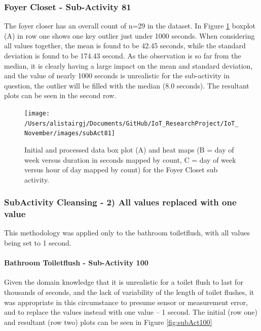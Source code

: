 \documentclass[11pt,]{article}
\let\oldparagraph\paragraph
\renewcommand{\paragraph}[1]{\oldparagraph{#1}\mbox{}}
\begin{document}
\hypertarget{foyer-closet---sub-activity-81}{%
\subsubsection{Foyer Closet - Sub-Activity
81}\label{foyer-closet---sub-activity-81}}

The foyer closer has an overall count of n=29 in the dataset. In Figure
\ref{fig:subAct81} boxplot (A) in row one shows one key outlier just
under 1000 seconds. When considering all values together, the mean is
found to be 42.45 seconds, while the standard deviation is found to be
174.43 second. As the observation is so far from the median, it is
clearly having a large impact on the mean and standard deviation, and
the value of nearly 1000 seconds is unrealistic for the sub-activity in
question, the outlier will be filled with the median (8.0 seconds). The
resultant plots can be seen in the second row.

\begin{figure}[H]

{\centering \texttt{[image: /Users/alistairgj/Documents/GitHub/IoT\_ResearchProject/IoT\_November/images/subAct81]} 

}

\caption{Initial and processed data box plot (A) and heat maps (B = day of week versus duration in seconds mapped by count, C = day of week versus hour of day mapped by count) for the Foyer Closet sub activity.}\label{fig:subAct81}
\end{figure}

\hypertarget{subactivity-cleansing---2-all-values-replaced-with-one-value}{%
\subsubsection{SubActivity Cleansing - 2) All values replaced with one
value}\label{subactivity-cleansing---2-all-values-replaced-with-one-value}}

This methodology was applied only to the bathroom toiletflush, with all
values being set to 1 second.

\hypertarget{bathroom-toiletflush---sub-activity-100}{%
\paragraph{Bathroom Toiletflush - Sub-Activity
100}\label{bathroom-toiletflush---sub-activity-100}}

Given the domain knowledge that it is unrealistic for a toilet flush to
last for thousands of seconds, and the lack of variability of the length
of toilet flushes, it was appropriate in this circumstance to presume
sensor or measurement error, and to replace the values instead with one
value -- 1 second. The initial (row one) and resultant (row two) plots
can be seen in Figure \ref{fig:subAct100}
\end{document}
